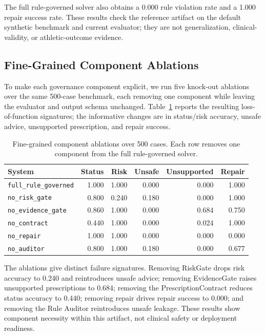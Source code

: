 \documentclass{ceurart}
\begin{document}
The full rule-governed solver also obtains a 0.000 rule violation rate and a 1.000 repair success rate. These results check the reference artifact on the default synthetic benchmark and current evaluator; they are not generalization, clinical-validity, or athletic-outcome evidence.

\subsection{Fine-Grained Component Ablations}

To make each governance component explicit, we run five knock-out ablations over the same 500-case benchmark, each removing one component while leaving the evaluator and output schema unchanged. Table~\ref{tab:fine-ablation} reports the resulting loss-of-function signatures; the informative changes are in status/risk accuracy, unsafe advice, unsupported prescription, and repair success.

\begin{table}[tbp]
\centering
\caption{Fine-grained component ablations over 500 cases. Each row removes one component from the full rule-governed solver.}
\label{tab:fine-ablation}
\small
\begin{tabular}{lrrrrr}
\toprule
System & Status & Risk & Unsafe & Unsupported & Repair \\
\midrule
\texttt{full\_rule\_governed} & 1.000 & 1.000 & 0.000 & 0.000 & 1.000 \\
\texttt{no\_risk\_gate} & 0.800 & 0.240 & 0.180 & 0.000 & 1.000 \\
\texttt{no\_evidence\_gate} & 0.860 & 1.000 & 0.000 & 0.684 & 0.750 \\
\texttt{no\_contract} & 0.440 & 1.000 & 0.000 & 0.024 & 1.000 \\
\texttt{no\_repair} & 1.000 & 1.000 & 0.000 & 0.000 & 0.000 \\
\texttt{no\_auditor} & 0.800 & 1.000 & 0.180 & 0.000 & 0.677 \\
\bottomrule
\end{tabular}
\end{table}

The ablations give distinct failure signatures. Removing RiskGate drops risk accuracy to 0.240 and reintroduces unsafe advice; removing EvidenceGate raises unsupported prescriptions to 0.684; removing the PrescriptionContract reduces status accuracy to 0.440; removing repair drives repair success to 0.000; and removing the Rule Auditor reintroduces unsafe leakage. These results show component necessity within this artifact, not clinical safety or deployment readiness.
\end{document}
